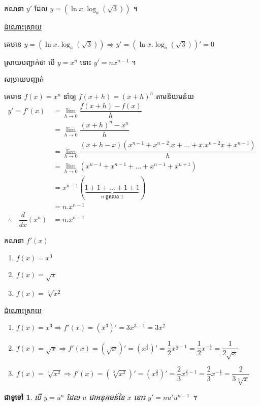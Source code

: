 \documentclass[12pt,fleqn]{book} %
\newtheorem{general}{\kml ជាទូទៅ}
\newcommand{\answer}{\begin{center}
\kml \color{blue} \underline{ដំណោះស្រាយ}
\end{center}}
\newcommand{\solution}{{\begin{center}\kml \color{blue} សម្រាយបញ្ជាក់\end{center} }}
\begin{document}
\begin{example}
គណនា $y'$ ដែល $y=\left(\ln x .\log_a (\sqrt{3}) \right)$ ។
\end{example}
\answer 
គេមាន $y=\left(\ln x .\log_a (\sqrt{3}) \right)\Rightarrow y'=\left(\ln x .\log_a (\sqrt{3}) \right)'=0$
\begin{example}
ស្រាយបញ្ជាក់ថា បើ $y=x^n$ នោះ $y'=nx^{n-1}$ ។
\end{example}
\solution
គេមាន $f(x)=x^n$ នាំឲ្យ $f(x+h)=(x+h)^n$ តាមនិយមន័យ
\begin{align*}
y'=f'(x)&=\lim_{h\to 0}\dfrac{f(x+h)-f(x)}{h}\\
&=\lim_{h\to 0}\dfrac{(x+h)^n-x^n}{h}\\
&=\lim_{h\to 0}\dfrac{(x+h-x)(x^{n-1}+x^{n-2}.x+...+x.x^{n-2}x+x^{n-1})}{h}\\
&=\lim_{h\to 0}(x^{n-1}+x^{n-1}+...+x^{n-1}+x^{n+1})\\
&=x^{n-1}(\underbrace{1+1+...+1+1}_{n\; \text{តួរលេខ 1}})\\
&=n.x^{n-1}\\
\therefore \quad \dfrac{d}{dx}(x^n)&=n.x^{n-1}
\end{align*}
\begin{example}
គណនា $f'(x)$ 
\begin{multicols}{3}
\begin{enumerate}
\item $f(x)=x^3$
\item $f(x)=\sqrt{x}$
\item $f(x)=\sqrt[3]{x^2}$
\end{enumerate}
\end{multicols}
\end{example}
\answer 
\begin{enumerate}
\item $f(x)=x^3 \Rightarrow f'(x)=(x^3)'=3 x^{3-1}=3x^2$
\item $f(x)=\sqrt{x} \Rightarrow f'(x)=(\sqrt{x})'=(x^{\frac{1}{2}})'=\dfrac{1}{2}x^{\frac{1}{2}-1}=\dfrac{1}{2}x^{-\frac{1}{2}}=\dfrac{1}{2\sqrt{x}}$
\item $f(x)=\sqrt[3]{x^2}\Rightarrow f'(x)=(\sqrt[3]{x^2})'=(x^{\frac{2}{3}})'=\dfrac{2}{3}x^{\frac{2}{3}-1}=\dfrac{2}{3}x^{-\frac{1}{3}}=\dfrac{2}{3\sqrt[3]{x}}$
\end{enumerate}
\begin{general}
បើ $y=u^n$ ដែល $u$ ជាអនុគមន៍នៃ $x$ នោះ $y'=n u' u^{n-1}$  ។  
\end{general}
\end{document}
